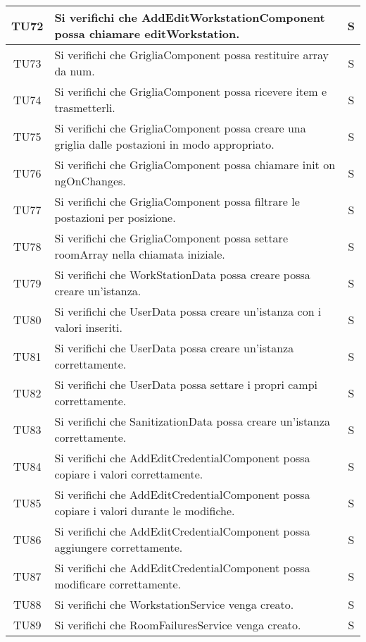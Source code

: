 \begin{center}
\begin{longtable}{|c|p{10cm}|c|}
			\hline
			TU72 & Si verifichi che AddEditWorkstationComponent possa chiamare editWorkstation. & S \\	
			\hline
			TU73 & Si verifichi che GrigliaComponent possa restituire array da num. & S \\	
			\hline
			TU74 & Si verifichi che GrigliaComponent possa ricevere item e trasmetterli. & S \\	
			\hline
			TU75 & Si verifichi che GrigliaComponent possa creare una griglia dalle postazioni in modo appropriato. & S \\	
			\hline
			TU76 & Si verifichi che GrigliaComponent possa chiamare init on ngOnChanges. & S \\	
			\hline
			TU77 & Si verifichi che GrigliaComponent possa filtrare le postazioni per posizione. & S \\	
			\hline
			TU78 & Si verifichi che GrigliaComponent possa settare roomArray nella chiamata iniziale. & S \\	
			\hline
			TU79 & Si verifichi che WorkStationData possa creare possa creare un'istanza. & S \\	
			\hline
			TU80 & Si verifichi che UserData possa creare un'istanza con i valori inseriti. & S \\	
			\hline
			TU81 & Si verifichi che UserData possa creare un'istanza correttamente. & S \\	
			\hline
			TU82 & Si verifichi che UserData possa settare i propri campi correttamente. & S \\	
			\hline
			TU83 & Si verifichi che SanitizationData possa creare un'istanza correttamente. & S \\	
			\hline
			TU84 & Si verifichi che AddEditCredentialComponent possa copiare i valori correttamente. & S \\	
			\hline
			TU85 & Si verifichi che AddEditCredentialComponent possa copiare i valori durante le modifiche. & S \\	
			\hline
			TU86 & Si verifichi che AddEditCredentialComponent possa aggiungere correttamente. & S \\	
			\hline
			TU87 & Si verifichi che AddEditCredentialComponent possa modificare correttamente. & S \\	
			\hline
			TU88 & Si verifichi che WorkstationService venga creato. & S \\	
			\hline
			TU89 & Si verifichi che RoomFailuresService venga creato. & S \\	
			\hline
			

\end{longtable}
\end{center}
